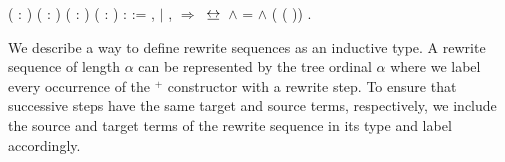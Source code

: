 \begin{singlespace}
\begin{coqdoccode}
\coqdocnoindent
{}
(  :
) (\coqdocvar{$\pi$} :
  ) (  :
) ( :
 
) :  :=\coqdoceol
\coqdocindent{1.00em}
 \coqdocvariable{$\pi$}, 
\coqdoceol
\coqdocindent{1.00em}
\ensuremath{|} 
\coqdocvar{\_} \coqdocvar{\_} \coqdocvar{$\rho$} 
\coqdocvar{$\sigma$} \coqdocvar{\_} \coqdocvar{\_} \coqdocvar{\_},
 \coqdocvar{\_}
\coqdocvar{\_}   
\coqdocvar{\_} \coqdocvar{\_} \coqdocvar{\_}
\ensuremath{\Rightarrow}\coqdoceol
\coqdocindent{2.00em}
 $\bis$  \ensuremath{\land}
\coqdocvariable{$\rho$} =  \ensuremath{\land}
(
( \coqdocvariable{$\rho$}))
\coqdocvariable{$\sigma$} \coqdoceol
\coqdocindent{1.00em}
.\coqdoceol
\end{coqdoccode}
\end{singlespace}

We describe a way to define rewrite sequences as an inductive type. A rewrite
sequence of length $\alpha$ can be represented by the tree ordinal $\alpha$
where we label every occurrence of the $^+$ constructor with a rewrite
step. To ensure that successive steps have the same target and source terms,
respectively, we include the source and target terms of the rewrite sequence
in its type and label accordingly.

